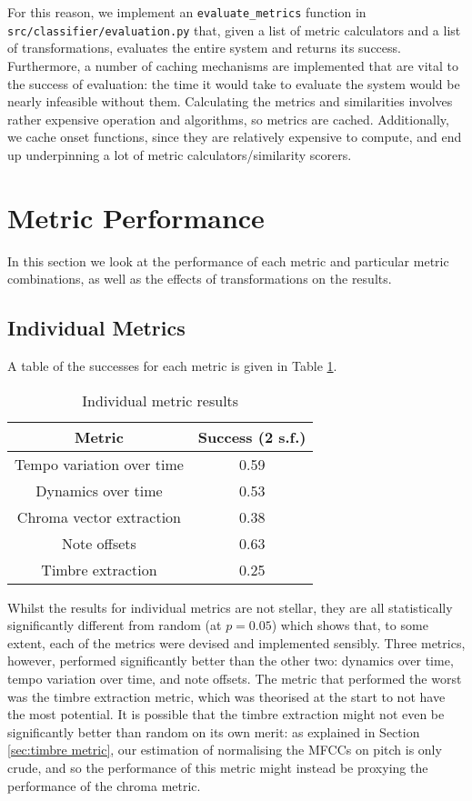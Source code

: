 \documentclass[oneside, class=book, 12pt, crop=false]{standalone}
\begin{document}
For this reason, we implement an \texttt{evaluate\_metrics} function in \texttt{src/classifier/evaluation.py} that, given a list of metric calculators and a list of transformations, evaluates the entire system and returns its success. Furthermore, a number of caching mechanisms are implemented that are vital to the success of evaluation: the time it would take to evaluate the system would be nearly infeasible without them. Calculating the metrics and similarities involves rather expensive operation and algorithms, so metrics are cached. Additionally, we cache onset functions, since they are relatively expensive to compute, and end up underpinning a lot of metric calculators/similarity scorers.

\section{Metric Performance}

In this section we look at the performance of each metric and particular metric combinations, as well as the effects of transformations on the results.

\subsection{Individual Metrics}

A table of the successes for each metric is given in Table \ref{table:metric results}. 

\begin{table}[h]
    \centering
    \begin{tabular}{cc}
        \textbf{Metric}&\textbf{Success} (2 s.f.) \\
        \midrule[0.15em]
        Tempo variation over time&0.59 \\
        Dynamics over time&0.53 \\
         Chroma vector extraction&0.38 \\
         Note offsets&0.63 \\
         Timbre extraction&0.25\\
    \end{tabular}
    \caption{Individual metric results}
    \label{table:metric results}
\end{table}

Whilst the results for individual metrics are not stellar, they are all statistically significantly different from random (at $p=0.05$) which shows that, to some extent, each of the metrics were devised and implemented sensibly. Three metrics, however, performed significantly better than the other two: dynamics over time, tempo variation over time, and note offsets. The metric that performed the worst was the timbre extraction metric, which was theorised at the start to not have the most potential. It is possible that the timbre extraction might not even be significantly better than random on its own merit: as explained in Section \ref{sec:timbre metric}, our estimation of normalising the MFCCs on pitch is only crude, and so the performance of this metric might instead be proxying the performance of the chroma metric.
\end{document}
